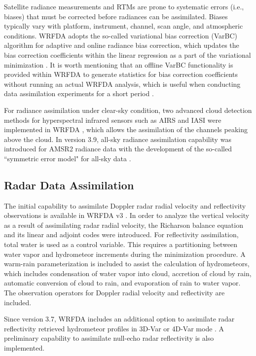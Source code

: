 Satellite radiance measurements and RTMs are prone to systematic errors (i.e., biases) that must be
corrected before radiances can be assimilated. Biases typically vary with platform, instrument, channel,
scan angle, and atmospheric conditions. WRFDA adopts the so-called variational bias correction (VarBC) 
algorithm for adaptive and online radiance bias correction, which updates the bias correction coefficients
within the linear regression as a part of the variational minimization \citep{dee04,auligne07}.
It is worth mentioning that an offline VarBC functionality is provided within WRFDA to generate statistics for bias correction
coefficients without running an actual WRFDA analysis, which is useful when conducting data assimilation
experiments for a short period \citep{liu12}.

For radiance assimilation under clear-sky condition, two advanced cloud detection methods for hyperspectral infrared sensors 
such as AIRS and IASI were implemented in WRFDA \citep{xu13, xu14, xu15, auligne14a, auligne14b}, 
which allows the assimilation of the channels peaking above the cloud.
In version 3.9, all-sky radiance assimilation capability was introduced for AMSR2 radiance data \citep{yang16} 
with the development of the so-called ``symmetric error model" for all-sky data \citep{geer11}.

\subsection{Radar Data Assimilation}

The initial capability to assimilate Doppler radar radial velocity and reflectivity observations is available in WRFDA v3
\citep{xiao05, xiao07, xiao072, xiao08}. In order to analyze the vertical velocity as a result of
assimilating radar radial velocity, the Richarson balance equation
 and its linear and adjoint codes were introduced.
For reflectivity assimilation, total water is used as a control variable. 
This requires a partitioning between water vapor and hydrometeor increments during the minimization procedure.
A warm-rain parameterization is included to assist the calculation of hydrometeors, which includes condensation of water vapor
into cloud, accretion of cloud by rain, automatic conversion of cloud to rain, and evaporation of rain to water vapor.
The observation operators for Doppler radial velocity and reflectivity are included.

Since version 3.7, WRFDA includes an additional option to assimilate radar reflectivity retrieved hydrometeor profiles 
in 3D-Var or 4D-Var mode \citep{wang13a, wang13b, sun13}. A preliminary capability to assimilate 
null-echo radar reflectivity is also implemented.

